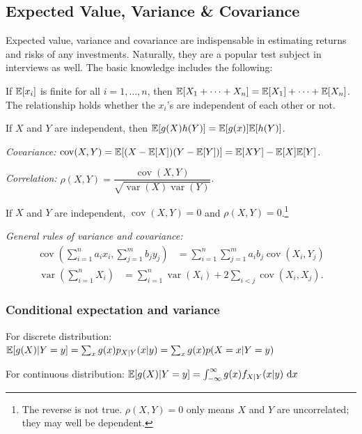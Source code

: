 \subsection{Expected Value, Variance \& Covariance}

Expected value, variance and covariance are indispensable in estimating returns and risks
of any investments. Naturally, they are a popular test subject in interviews as well. The
basic knowledge includes the following:

If $\mathbb{E}[x_i]$ is finite for all $i=1,\ldots,n$, then
$\mathbb{E}[X_1+\cdots+X_n]=\mathbb{E}[X_1]+\cdots+\mathbb{E}[X_n]$. The relationship holds whether the $x_i$'s
are independent of each other or not.

If $X$ and $Y$ are independent, then $\mathbb{E}[g(X)h(Y)]=\mathbb{E}[g(x)]\mathbb{E}[h(Y)]$.

\noindent\emph{Covariance:} $\operatorname{cov}(X,Y)=\mathbb{E}[(X-\mathbb{E}[X])(Y-\mathbb{E}[Y])]=\mathbb{E}[XY]-\mathbb{E}[X]\mathbb{E}[Y]$.

\noindent\emph{Correlation:} $\rho(X,Y)=\dfrac{\operatorname{cov}(X,Y)}{\sqrt{\operatorname{var}(X)\operatorname{var}(Y)}}$.

If $X$ and $Y$ are independent, $\operatorname{cov}(X,Y)=0$ and $\rho(X,Y)=0$.\footnote[26]{The reverse is not true. $\rho(X,Y)=0$ only means $X$ and $Y$ are uncorrelated; they may well be dependent.}

\noindent\emph{General rules of variance and covariance:}
\[
\begin{aligned}
\operatorname{cov}\left(\sum_{i=1}^{n}a_i x_i,\sum_{j=1}^{m}b_j y_j\right)
&=\sum_{i=1}^{n}\sum_{j=1}^{m}a_i b_j\operatorname{cov}(X_i,Y_j)
\end{aligned}
\]
\[
\begin{aligned}
\operatorname{var}\left(\sum_{i=1}^{n}X_i\right)
&=\sum_{i=1}^{n}\operatorname{var}(X_i)+2\sum_{i<j}\operatorname{cov}(X_i,X_j).
\end{aligned}
\]


\subsubsection{Conditional expectation and variance}

For discrete distribution:
$\mathbb{E}[g(X)\vert Y=y]=\sum_xg(x)p_{X\vert Y}(x\vert y)=\sum_xg(x)p(X=x\vert Y=y)$

For continuous distribution:
$\mathbb{E}[g(X)\vert Y=y]=\int_{-\infty}^{\infty}g(x)f_{X\vert Y}(x\vert y)\,\mathop{}\!\mathrm{d} x$

